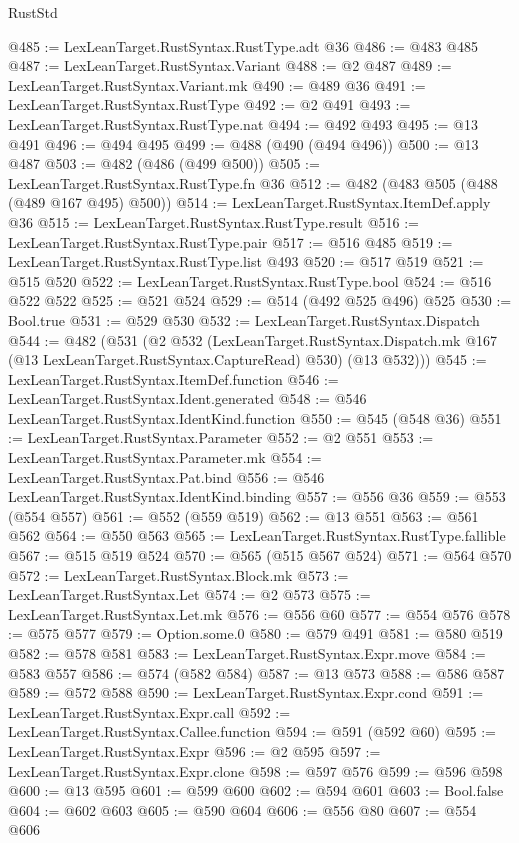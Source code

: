 \begin{lexlean}{RustStd}
\begin{coremodule}
{\begin{coremodule}
{{{{{{{{{{{{{{{{@485 := LexLeanTarget.RustSyntax.RustType.adt @36
@486 := @483 @485
@487 := LexLeanTarget.RustSyntax.Variant
@488 := @2 @487
@489 := LexLeanTarget.RustSyntax.Variant.mk
@490 := @489 @36
@491 := LexLeanTarget.RustSyntax.RustType
@492 := @2 @491
@493 := LexLeanTarget.RustSyntax.RustType.nat
@494 := @492 @493
@495 := @13 @491
@496 := @494 @495
@499 := @488 (@490 (@494 @496))
@500 := @13 @487
@503 := @482 (@486 (@499 @500))
@505 := LexLeanTarget.RustSyntax.RustType.fn @36
@512 := @482 (@483 @505 (@488 (@489 @167 @495) @500))
@514 := LexLeanTarget.RustSyntax.ItemDef.apply @36
@515 := LexLeanTarget.RustSyntax.RustType.result
@516 := LexLeanTarget.RustSyntax.RustType.pair
@517 := @516 @485
@519 := LexLeanTarget.RustSyntax.RustType.list @493
@520 := @517 @519
@521 := @515 @520
@522 := LexLeanTarget.RustSyntax.RustType.bool
@524 := @516 @522 @522
@525 := @521 @524
@529 := @514 (@492 @525 @496) @525
@530 := Bool.true
@531 := @529 @530
@532 := LexLeanTarget.RustSyntax.Dispatch
@544 := @482
    (@531
      (@2
        @532
        (LexLeanTarget.RustSyntax.Dispatch.mk @167 (@13 LexLeanTarget.RustSyntax.CaptureRead) @530)
        (@13 @532)))
@545 := LexLeanTarget.RustSyntax.ItemDef.function
@546 := LexLeanTarget.RustSyntax.Ident.generated
@548 := @546 LexLeanTarget.RustSyntax.IdentKind.function
@550 := @545 (@548 @36)
@551 := LexLeanTarget.RustSyntax.Parameter
@552 := @2 @551
@553 := LexLeanTarget.RustSyntax.Parameter.mk
@554 := LexLeanTarget.RustSyntax.Pat.bind
@556 := @546 LexLeanTarget.RustSyntax.IdentKind.binding
@557 := @556 @36
@559 := @553 (@554 @557)
@561 := @552 (@559 @519)
@562 := @13 @551
@563 := @561 @562
@564 := @550 @563
@565 := LexLeanTarget.RustSyntax.RustType.fallible
@567 := @515 @519 @524
@570 := @565 (@515 @567 @524)
@571 := @564 @570
@572 := LexLeanTarget.RustSyntax.Block.mk
@573 := LexLeanTarget.RustSyntax.Let
@574 := @2 @573
@575 := LexLeanTarget.RustSyntax.Let.mk
@576 := @556 @60
@577 := @554 @576
@578 := @575 @577
@579 := Option.some.{0}
@580 := @579 @491
@581 := @580 @519
@582 := @578 @581
@583 := LexLeanTarget.RustSyntax.Expr.move
@584 := @583 @557
@586 := @574 (@582 @584)
@587 := @13 @573
@588 := @586 @587
@589 := @572 @588
@590 := LexLeanTarget.RustSyntax.Expr.cond
@591 := LexLeanTarget.RustSyntax.Expr.call
@592 := LexLeanTarget.RustSyntax.Callee.function
@594 := @591 (@592 @60)
@595 := LexLeanTarget.RustSyntax.Expr
@596 := @2 @595
@597 := LexLeanTarget.RustSyntax.Expr.clone
@598 := @597 @576
@599 := @596 @598
@600 := @13 @595
@601 := @599 @600
@602 := @594 @601
@603 := Bool.false
@604 := @602 @603
@605 := @590 @604
@606 := @556 @80
@607 := @554 @606
}}}}}}}}}}}}}}}}
\end{coremodule}}
\end{coremodule}
\end{lexlean}
